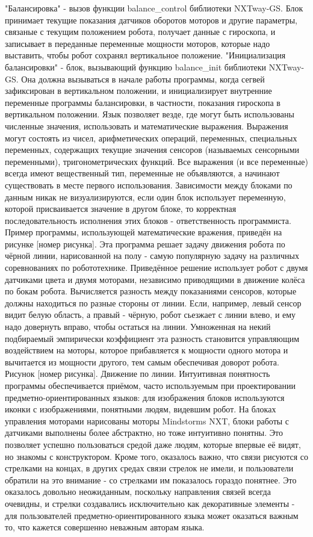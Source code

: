 "Балансировка" - вызов функции balance_control библиотеки NXTway-GS. Блок принимает текущие показания датчиков оборотов моторов и другие параметры, связаные с текущим положением робота, получает данные с гироскопа, и записывает в переданные переменные мощности моторов, которые надо выставить, чтобы робот сохранял вертикальное положение.
"Инициализация балансировки" - блок, вызывающий функцию balance_init библиотеки NXTway-GS. Она должна вызываться в начале работы программы, когда сегвей зафиксирован в вертикальном положении, и инициализирует внутренние переменные программы балансировки, в частности, показания гироскопа в вертикальном положении.
	Язык позволяет везде, где могут быть использованы численные значения, использовать и математические выражения. Выражения могут состоять из чисел, арифметических операций, переменных, специальных переменных, содержащих текущие значения сенсоров (называемых сенсорными переменными), тригонометрических функций. Все выражения (и все переменные) всегда имеют вещественный тип, переменные не объявляются, а начинают существовать в месте первого использования. Зависимости между блоками по данным никак не визуализируются, если один блок использует переменную, которой присваивается значение в другом блоке, то корректная последовательность исполнения этих блоков - ответственность программиста. 
	Пример программы, использующей математические вражения, приведён на рисунке [номер рисунка]. Эта программа решает задачу движения робота по чёрной линии, нарисованной на полу - самую популярную задачу на различных соревнованиях по робототехнике. Приведённое решение использует робот с двумя датчиками цвета и двумя моторами, независимо приводящими в движение колёса по бокам робота. Вычисляется разность между показаниями сенсоров, которые должны находиться по разные стороны от линии. Если, например, левый сенсор видит белую область, а правый - чёрную, робот сьезжает с линии влево, и ему надо довернуть вправо, чтобы остаться на линии. Умноженная на некий подбираемый эмпирически коэффициент эта разность становится управляющим воздействием на моторы, которое прибавляется к мощности одного мотора и вычитается из мощности другого, тем самым обеспечивая доворот робота.
Рисунок [номер рисунка]. Движение по линии.
	Интуитивная понятность программы обеспечивается приёмом, часто используемым при проектировании предметно-ориентированных языков: для изображения блоков используются иконки с изображениями, понятными людям, видевшим робот. На блоках управления моторами нарисованы моторы Mindstorms NXT, блоки работы с датчиками выполнены более абстрактно, но тоже интуитивно понятны. Это позволяет успешно пользоваться средой даже людям, которые впервые её видят, но знакомы с конструктором. Кроме того, оказалось важно, что связи рисуются со стрелками на концах, в других средах связи стрелок не имели, и пользователи обратили на это внимание - со стрелками им показалось гораздо понятнее. Это оказалось довольно неожиданным, поскольку направления связей всегда очевидны, и стрелки создавались исключительно как декоративные элементы - для пользователей предметно-ориентированного языка может оказаться важным то, что кажется совершенно неважным авторам языка.
